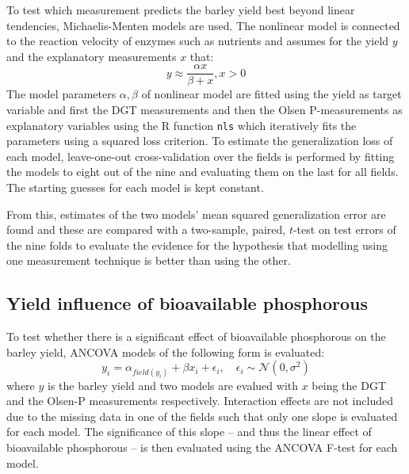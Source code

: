 \documentclass[11pt,fleqn]{article}
\begin{document}
To test which measurement predicts the barley yield best beyond linear tendencies, Michaelis-Menten models are used. The nonlinear model is connected to the reaction velocity of enzymes such as nutrients \cite{michment} and assumes for the yield \(y\) and the explanatory measurements \(x\) that:
\[
y \approx \frac{\alpha x}{\beta + x}, x >0
\]
The model parameters \(\alpha, \beta\) of nonlinear model are fitted using the yield as target variable and first the DGT measurements and then the Olsen P-measurements as explanatory variables using the R function \texttt{nls} which iteratively fits the parameters using a squared loss criterion.  To estimate the generalization loss of each model, leave-one-out cross-validation over the fields is performed by fitting the models to eight out of the nine and evaluating them on the last for all fields. The starting guesses for each model is kept constant.

From this, estimates of the two models' mean squared generalization error are found and these are compared with a two-sample, paired, $t$-test on test errors of the nine folds to evaluate the evidence for the hypothesis that modelling using one measurement technique is better than using the other.
\subsection{Yield influence of bioavailable phosphorous}
To test whether there is a significant effect of bioavailable phosphorous on the barley yield, ANCOVA models of the following form is evaluated:
\[
y_i = \alpha_{field(y_i)} + \beta x_i + \epsilon_i, \quad \epsilon_i \sim \mathcal N (0, \sigma^2)
\]
where \(y\) is the barley yield and two models are evalued with \(x\) being the DGT and the Olsen-P measurements respectively. Interaction effects are not included due to the missing data in one of the fields such that only one slope is evaluated for each model. The significance of this slope -- and thus the linear effect of bioavailable phosphorous -- is then evaluated using the ANCOVA F-test for each model.
\end{document}
